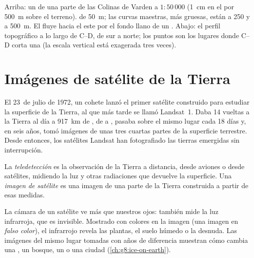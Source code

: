 \begin{omfigure}
{\small Arriba: un  de una parte de las Colinas de Varden a
$1 : 50\,000$ (1~cm en el  por \qty{500}{m} sobre el terreno).
 de \qty{50}{m}; las curvas maestras, más gruesas, están a 250
y a \qty{500}{m}. El  fluye hacia el este por el fondo llano de un
. Abajo: el perfil topográfico a lo largo de C--D, de sur a norte; los
puntos son los lugares donde C--D corta una  (la escala
vertical está exagerada tres veces).}
\label{fig:g9:maps-of-the-earth:topo}
\end{omfigure}

\section{Imágenes de satélite de la Tierra}

El 23~de julio de 1972, un cohete lanzó el primer satélite construido para
estudiar la superficie de la Tierra, al que más tarde se llamó Landsat~1.
Daba 14 vueltas a la Tierra al día a \qty{917}{km} de , de  a
, pasaba sobre el mismo lugar cada 18 días y, en seis años, tomó
imágenes de unas tres cuartas partes de la superficie terrestre. Desde
entonces, los satélites Landsat han fotografiado las tierras emergidas sin
interrupción.

\begin{definition}\label{def:g9:maps-of-the-earth:remote-sensing}
La \emph{teledetección} es la
observación de la Tierra a distancia, desde aviones o desde satélites,
midiendo la luz y otras radiaciones que devuelve la superficie. Una
\emph{imagen de satélite} es
una imagen de una parte de la Tierra construida a partir de esas medidas.
\end{definition}

La cámara de un satélite ve más que nuestros ojos: también mide la luz
infrarroja, que es invisible. Mostrado con colores en la imagen (una imagen
en \emph{falso color}), el infrarrojo revela las plantas, el suelo húmedo o
la  desnuda. Las imágenes del mismo lugar tomadas con años de
diferencia muestran cómo cambia una , un bosque, un  o una
ciudad (\cref{ch:g8:ice-on-earth}).

